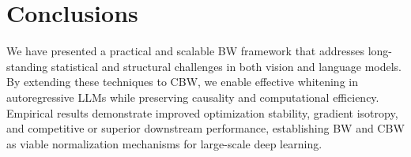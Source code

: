 \section{Conclusions} \label{sec:conclusions}

We have presented a practical and scalable BW framework that addresses long-standing statistical and structural challenges in both vision and language models.
By extending these techniques to CBW, we enable effective whitening in autoregressive LLMs while preserving causality and computational efficiency.
Empirical results demonstrate improved optimization stability, gradient isotropy, and competitive or superior downstream performance, establishing BW and CBW as viable normalization mechanisms for large-scale deep learning.
